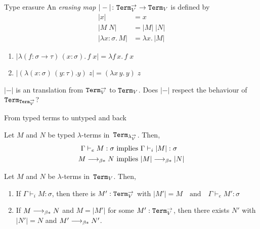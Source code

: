 \begin{frame}{Type erasure}
An \emph{erasing map} $|-|\colon \mathtt{Term}_{V}^{\to} \to \mathtt{Term}_{V}$ is defined by
  \begin{align*}
    |x| & = x \\
    |M\; N| & = |M|\;|N| \\
    |\lambda x:\sigma.\, M| & = \lambda x.\, |M|
  \end{align*}
  \begin{example}
    \begin{enumerate}
      \item $|\lambda (f: \sigma \to \tau)\,(x: \sigma).\, f\;x| = \lambda f\, x.\, f\;x$
      \item $|(\lambda (x: \sigma)\,(y: \tau). y)\;z| = (\lambda x\,y.\, y)\; z$
    \end{enumerate}
  \end{example}

$|-|$ is an translation from $\mathtt{Term}_{V}^{\to}$ to $\mathtt{Term}_{V}$.
Does $|-|$ respect the behaviour of $\mathtt{Term}_{\mathtt{Term}_V^{\to}}$?
\end{frame}
\begin{frame}{From typed terms to untyped and back}
\begin{proposition}
  Let $M$ and $N$ be typed $\lambda$-terms in~$\mathtt{Term}_{\lambda_V^{\to}}$. Then, 
  \begin{align*}
    \Gamma  \vdash_e M : \sigma & \text{ implies } \Gamma \vdash_i |M| :
    \sigma \\ 
    M \longrightarrow_{\beta*} N & \text{ implies } |M| \longrightarrow_{\beta*} |N|
  \end{align*}
\end{proposition}

\begin{proposition}
  Let $M$ and $N$ be $\lambda$-terms in~$\mathtt{Term}_V$. Then, 
  \begin{enumerate}
  \item If $\Gamma \vdash_i M : \sigma$, then there is $M' : \mathtt{Term}_V^{\to}$ with 
        $|M'| = M
        \quad\text{and}\quad
        \Gamma \vdash_e M' : \sigma$
      \item If $M \longrightarrow_{\beta*} N$ and $M = |M'|$ for some $M' : \mathtt{Term}_V^{\to}$,
      then there exists $N'$ with $|N'| = N$ and $M' \longrightarrow_{\beta*} N'$.
    \end{enumerate}
\end{proposition}
\end{frame}

